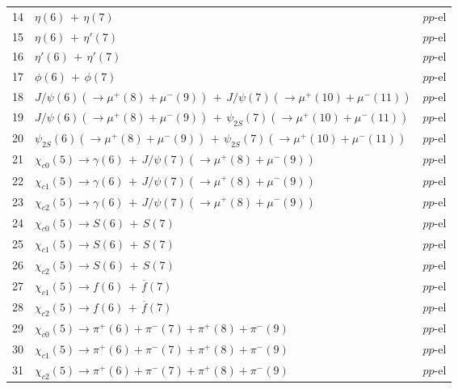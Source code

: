 \documentclass[12pt]{article}
\begin{document}
\begin{center}
\begin{table}[htbp!]
\begin{tabular}{|c|l|l|}
14 & $\eta(6)\,+\,\eta(7)$ &  $pp$-el  \\

15 & $\eta(6)\,+\,\eta'(7)$ &  $pp$-el  \\

16 & $\eta'(6)\,+\,\eta'(7)$ &  $pp$-el  \\

17 & $\phi(6)\,+\,\phi(7)$ &  $pp$-el  \\

18 & $J/\psi(6)(\to \mu^+(8)+\mu^-(9))\,+\,J/\psi(7)(\to \mu^+(10)+\mu^-(11))$ &  $pp$-el  \\

19 & $J/\psi(6)(\to \mu^+(8)+\mu^-(9))\,+\,\psi_{2S}(7)(\to \mu^+(10)+\mu^-(11))$ &  $pp$-el  \\

20 & $\psi_{2S}(6)(\to \mu^+(8)+\mu^-(9))\,+\,\psi_{2S}(7)(\to \mu^+(10)+\mu^-(11))$ &  $pp$-el  \\

21 & $\chi_{c0}(5)\to \gamma(6)\,+\,J/\psi(7)(\to \mu^+(8)+\mu^-(9))$ &  $pp$-el  \\

22 & $\chi_{c1}(5)\to \gamma(6)\,+\,J/\psi(7)(\to \mu^+(8)+\mu^-(9))$ &  $pp$-el  \\

23 & $\chi_{c2}(5)\to \gamma(6)\,+\,J/\psi(7)(\to \mu^+(8)+\mu^-(9))$ &  $pp$-el  \\

24 & $\chi_{c0}(5)\to S(6)\,+\,S(7)$ &  $pp$-el  \\

25 & $\chi_{c1}(5)\to S(6)\,+\,S(7)$ &  $pp$-el  \\

26 & $\chi_{c2}(5)\to S(6)\,+\,S(7)$ &  $pp$-el  \\

27 & $\chi_{c1}(5)\to f(6)\,+\,\overline{f}(7)$ &  $pp$-el  \\

28 & $\chi_{c2}(5)\to f(6)\,+\,\overline{f}(7)$ &  $pp$-el  \\

29 & $\chi_{c0}(5)\to \pi^+(6)+\pi^-(7)+\pi^+(8)+\pi^-(9)$ &  $pp$-el  \\

30 & $\chi_{c1}(5)\to \pi^+(6)+\pi^-(7)+\pi^+(8)+\pi^-(9)$ &  $pp$-el  \\

31 & $\chi_{c2}(5)\to \pi^+(6)+\pi^-(7)+\pi^+(8)+\pi^-(9)$ &  $pp$-el  \\


\end{tabular}
\end{table}
\end{center}
\end{document}
